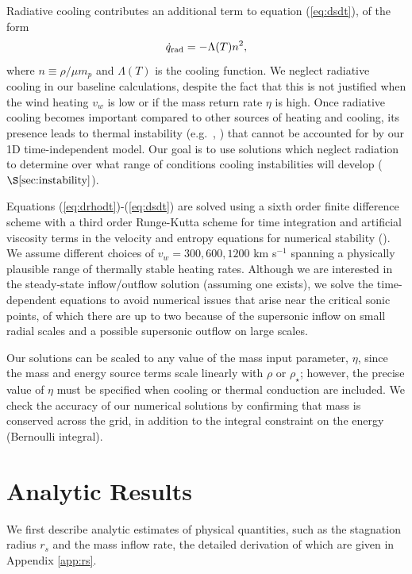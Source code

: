 \documentclass[usenatbib,fleqn]{mn2e}
\newcommand{\rs}{r_s}
\newcommand{\vwO}{v_{w}}
\begin{document}
 Radiative cooling contributes an additional term to equation
 (\ref{eq:dsdt}), of the form
\begin{equation}
\dot{q}_{\rm rad} = -\Lambda(T)n^{2},
\label{eq:qdot_rad}
\end{equation}
where $n \equiv \rho/\mu m_p$ and $\Lambda(T)$ is the cooling
function.  We neglect radiative cooling in our baseline calculations,
despite the fact that this is not justified when the wind heating
$\vwO$ is low or if the mass return rate $\eta$ is high.  Once
radiative cooling becomes important compared to other sources of
heating and cooling, its presence leads to thermal instability
(e.g.~\citealt{McCourt+12}, \citealt{Li&Bryan14a}) that cannot be
accounted for by our 1D time-independent model.  Our goal is to use
solutions which neglect radiation to determine over what range of
conditions cooling instabilities will develop
($\S\ref{sec:instability}$).

Equations (\ref{eq:drhodt})-(\ref{eq:dsdt}) 
are solved using a sixth
order finite difference scheme with a third order Runge-Kutta scheme
for time integration and artificial viscosity terms in the velocity
and entropy equations for numerical stability
(\citealt{Brandenburg:2003a}).  We assume different choices of $v_{w}
= 300, 600, 1200$ km s$^{-1}$ spanning a physically plausible range of
thermally stable heating rates.  Although we are
interested in the steady-state inflow/outflow solution (assuming one
exists), we solve the time-dependent equations to avoid numerical
issues that arise near the critical sonic points, of which there are
up to two because of the supersonic inflow on small radial scales and
a possible supersonic outflow on large scales.  

Our
solutions can be scaled to any value of the mass input parameter,
$\eta$, since the mass and energy source terms scale linearly with
$\rho$ or $\rho_{\star}$; however, the precise value of $\eta$ must be
specified when cooling or thermal conduction are included.  We check the accuracy of
our numerical solutions by confirming that mass is conserved across
the grid, in addition to the integral constraint on the energy
(Bernoulli integral).



\section{Analytic Results}
\label{sec:results}

We first describe analytic estimates of physical quantities, such as
the stagnation radius $\rs$ and the mass inflow rate, the detailed
derivation of which are given in Appendix \ref{app:rs}.  
\end{document}
